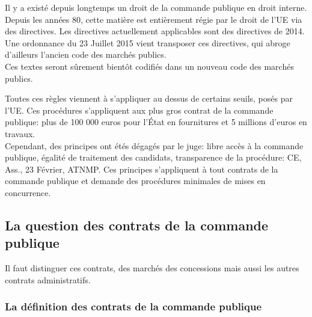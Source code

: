 \documentclass[10pt, a4paper, openany]{book}
\begin{document}
Il y a existé depuis longtemps un droit de la commande publique en droit interne. Depuis les années 80, cette matière est entièrement régie par le droit de l'UE via des directives. Les directives actuellement applicables sont des directives de 2014. Une ordonnance du 23 Juillet 2015 vient transposer ces directives, qui abroge d'ailleurs l'ancien code des marchés publics. \\
Ces textes seront sûrement bientôt codifiés dans un nouveau code des marchés publics. 


Toutes ces règles viennent à s'appliquer au dessus de certains seuils, posés par l'UE. Ces procédures s'appliquent aux plus gros contrat de la commande publique: plus de 100 000 euros pour l'État en fournitures et 5 millions d'euros en travaux. \\
Cependant, des principes ont étés dégagés par le juge: libre accès à la commande publique, égalité de traitement des candidats, transparence de la procédure: CE, Ass., 23 Février, ATNMP. Ces principes s'appliquent à tout contrats de la commande publique et demande des procédures minimales de mises en concurrence. 

\subsection{La question des contrats de la commande publique}

Il faut distinguer ces contrats, des marchés des concessions mais aussi les autres contrats administratifs.

\subsubsection{La définition des contrats de la commande publique}
\end{document}
